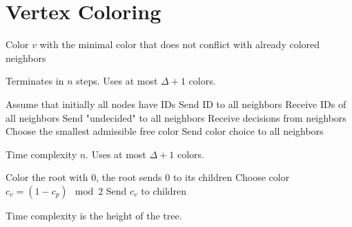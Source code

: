 \documentclass[11pt, oneside]{book}   						%
\begin{document}
\section{Vertex Coloring}
\textbf{}
\begin{algorithm}
\caption{}\label{greedyseq}
\begin{algorithmic}[1]
	\State Color $v$ with the minimal color that does not conflict with already colored neighbors
\EndWhile
\end{algorithmic}
\end{algorithm}
\begin{mythm} Terminates in $n$ steps. Uses at most $\Delta+1$ colors.\end{mythm}

\begin{algorithm}
\caption{}\label{reduce}
\begin{algorithmic}[1]
\State Assume that initially all nodes have IDs
\ForEach [node $v$]
	\State Send ID to all neighbors
	\State Receive IDs of all neighbors
		\State Send "undecided" to all neighbors
		\State Receive decisions from neighbors
	\EndWhile
	\State Choose the smallest admissible free color
	\State Send color choice to all neighbors
\EndForEach
\end{algorithmic}
\end{algorithm}
\begin{mythm} Time complexity $n$. Uses at most $\Delta +1$ colors.\end{mythm}

\begin{algorithm}[H]
\caption{}\label{slowtree}
\begin{algorithmic}[1]
\State Color the root with 0, the root sends 0 to its children
\ForEach[node $v$]
		\State Choose color $c_v=(1-c_p)\mod 2$
		\State Send $c_v$ to children
	\EndIf
\EndForEach
\end{algorithmic}
\end{algorithm}
\begin{mythm} Time complexity is the height of the tree.\end{mythm}
\end{document}
